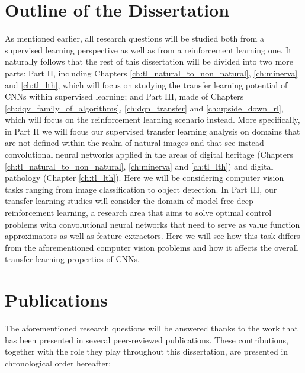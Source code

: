 \section*{Outline of the Dissertation}


As mentioned earlier, all research questions will be studied both from a supervised learning perspective as well as from a reinforcement learning one. It naturally follows that the rest of this dissertation will be divided into two more parts: Part II, including Chapters \ref{ch:tl_natural_to_non_natural}, \ref{ch:minerva} and \ref{ch:tl_lth}, which will focus on studying the transfer learning potential of CNNs within supervised learning; and Part III, made of Chapters \ref{ch:dqv_family_of_algorithms}, \ref{ch:dqn_transfer} and \ref{ch:upside_down_rl}, which will focus on the reinforcement learning scenario instead. More specifically, in Part II we will focus our supervised transfer learning analysis on domains that are not defined within the realm of natural images and that see instead convolutional neural networks applied in the areas of digital heritage (Chapters \ref{ch:tl_natural_to_non_natural}, \ref{ch:minerva} and \ref{ch:tl_lth}) and digital pathology (Chapter \ref{ch:tl_lth}). Here we will be considering computer vision tasks ranging from image classification to object detection. In Part III, our transfer learning studies will consider the domain of model-free deep reinforcement learning, a research area that aims to solve optimal control problems with convolutional neural networks that need to serve as value function approximators as well as feature extractors. Here we will see how this task differs from the aforementioned computer vision problems and how it affects the overall transfer learning properties of CNNs. 


\section*{Publications}

The aforementioned research questions will be answered thanks to the work that has been presented in several peer-reviewed publications. These contributions, together with the role they play throughout this dissertation, are presented in chronological order hereafter:

